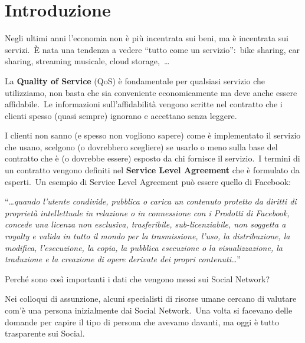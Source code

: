 \chapter{Introduzione}

Negli ultimi anni l'economia non è più incentrata sui beni, ma è incentrata sui servizi.\
È nata una tendenza a vedere ``tutto come un servizio'':\ bike sharing, car sharing, streaming musicale, cloud storage,\ \dots

La \textbf{Quality of Service} (QoS) è fondamentale per qualsiasi servizio che utilizziamo, non basta che sia conveniente economicamente ma deve anche essere affidabile.\
Le informazioni sull'affidabilità vengono scritte nel contratto che i clienti spesso (quasi sempre) ignorano e accettano senza leggere.

I clienti non sanno (e spesso non vogliono sapere) come è implementato il servizio che usano, scelgono (o dovrebbero scegliere) se usarlo o meno sulla base del contratto che è (o dovrebbe essere) esposto da chi fornisce il servizio.\
I termini di un contratto vengono definiti nel \textbf{Service Level Agreement} che è formulato da esperti.\
Un esempio di Service Level Agreement può essere quello di Facebook:

\vspace{12pt}
\noindent``\dots\textit{quando l'utente condivide, pubblica o carica un contenuto protetto da diritti di proprietà intellettuale in relazione o in connessione con i Prodotti di Facebook, concede una licenza non esclusiva, trasferibile, sub-licenziabile, non soggetta a royalty e valida in tutto il mondo per la trasmissione, l'uso, la distribuzione, la modifica, l'esecuzione, la copia, la pubblica esecuzione o la visualizzazione, la traduzione e la creazione di opere derivate dei propri contenuti}\dots''

\begin{center}
    Perché sono così importanti i dati che vengono messi sui Social Network?\
\end{center}
Nei colloqui di assunzione, alcuni specialisti di risorse umane cercano di valutare com'è una persona inizialmente dai Social Network.\
Una volta si facevano delle domande per capire il tipo di persona che avevamo davanti, ma oggi è tutto trasparente sui Social.\

